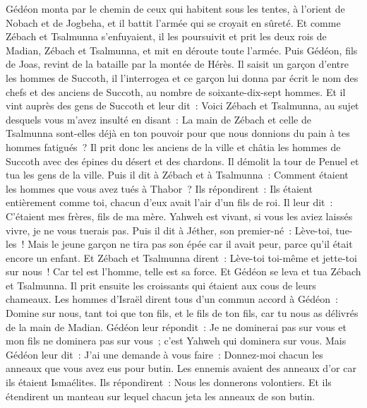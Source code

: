 \begin{multicols}{2}
Gédéon monta par le chemin de ceux qui habitent sous les tentes, à l'orient de Nobach et de Jogbeha, et il battit l'armée qui se croyait en sûreté.
Et comme Zébach et Tsalmunna s'enfuyaient, il les poursuivit et prit les deux rois de Madian, Zébach et Tsalmunna, et mit en déroute toute l'armée.
Puis Gédéon, fils de Joas, revint de la bataille par la montée de Hérès.
Il saisit un garçon d'entre les hommes de Succoth, il l'interrogea et ce garçon lui donna par écrit le nom des chefs et des anciens de Succoth, au nombre de soixante-dix-sept hommes.
Et il vint auprès des gens de Succoth et leur dit~: Voici Zébach et Tsalmunna, au sujet desquels vous m'avez insulté en disant~: La main de Zébach et celle de Tsalmunna sont-elles déjà en ton pouvoir pour que nous donnions du pain à tes hommes fatigués~?
Il prit donc les anciens de la ville et châtia les hommes de Succoth avec des épines du désert et des chardons.
Il démolit la tour de Penuel et tua les gens de la ville.
Puis il dit à Zébach et à Tsalmunna~: Comment étaient les hommes que vous avez tués à Thabor~? Ils répondirent~: Ils étaient entièrement comme toi, chacun d'eux avait l'air d'un fils de roi.
Il leur dit~: C'étaient mes frères, fils de ma mère. Yahweh est vivant, si vous les aviez laissés vivre, je ne vous tuerais pas.
Puis il dit à Jéther, son premier-né~: Lève-toi, tue-les~! Mais le jeune garçon ne tira pas son épée car il avait peur, parce qu'il était encore un enfant.
Et Zébach et Tsalmunna dirent~: Lève-toi toi-même et jette-toi sur nous~! Car tel est l'homme, telle est sa force. Et Gédéon se leva et tua Zébach et Tsalmunna. Il prit ensuite les croissants qui étaient aux cous de leurs chameaux.
Les hommes d'Israël dirent tous d'un commun accord à Gédéon~: Domine sur nous, tant toi que ton fils, et le fils de ton fils, car tu nous as délivrés de la main de Madian.
Gédéon leur répondit~: Je ne dominerai pas sur vous et mon fils ne dominera pas sur vous~; c'est Yahweh qui dominera sur vous.
Mais Gédéon leur dit~: J'ai une demande à vous faire~: Donnez-moi chacun les anneaux que vous avez eus pour butin. Les ennemis avaient des anneaux d'or car ils étaient Ismaélites.
Ils répondirent~: Nous les donnerons volontiers. Et ils étendirent un manteau sur lequel chacun jeta les anneaux de son butin.

\end{multicols}
